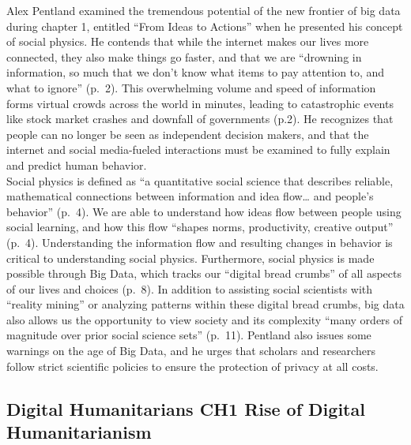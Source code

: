 \documentclass[]{book}
\begin{document}
Alex Pentland examined the tremendous potential of the new frontier of big data during chapter 1, entitled
``From Ideas to Actions'' when he presented his concept of social physics. He contends that while the
internet makes our lives more connected, they also make things go faster, and that we are ``drowning in information,
so much that we don't know what items to pay attention to, and what to ignore'' (p.~2). This overwhelming volume and speed of
information forms virtual crowds across the world in minutes, leading to catastrophic events like stock market crashes and
downfall of governments (p.2). He recognizes that people can no longer be seen as independent decision makers, and that the
internet and social media-fueled interactions must be examined to fully explain and predict human behavior.\\
Social physics is defined as ``a quantitative social science that describes reliable, mathematical connections between information
and idea flow\ldots{} and people's behavior'' (p.~4). We are able to understand how ideas flow between people using social learning,
and how this flow ``shapes norms, productivity, creative output'' (p.~4). Understanding the information flow and resulting changes
in behavior is critical to understanding social physics. Furthermore, social physics is made possible through Big Data, which
tracks our ``digital bread crumbs'' of all aspects of our lives and choices (p.~8). In addition to assisting social scientists
with ``reality mining'' or analyzing patterns within these digital bread crumbs, big data also allows us the opportunity to view
society and its complexity ``many orders of magnitude over prior social science sets'' (p.~11). Pentland also issues some warnings
on the age of Big Data, and he urges that scholars and researchers follow strict scientific policies to ensure the protection
of privacy at all costs.

\hypertarget{digital-humanitarians-ch1-rise-of-digital-humanitarianism}{%
\subsection{\texorpdfstring{Digital Humanitarians \textbf{CH1 Rise of Digital Humanitarianism}}{Digital Humanitarians CH1 Rise of Digital Humanitarianism}}\label{digital-humanitarians-ch1-rise-of-digital-humanitarianism}}
\end{document}
